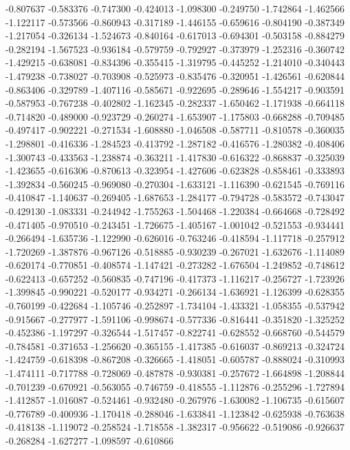 -0.807637
-0.583376
-0.747300
-0.424013
-1.098300
-0.249750
-1.742864
-1.462566
-1.122117
-0.573566
-0.860943
-0.317189
-1.446155
-0.659616
-0.804190
-0.387349
-1.217054
-0.326134
-1.524673
-0.840164
-0.617013
-0.694301
-0.503158
-0.884279
-0.282194
-1.567523
-0.936184
-0.579759
-0.792927
-0.373979
-1.252316
-0.360742
-1.429215
-0.638081
-0.834396
-0.355415
-1.319795
-0.445252
-1.214010
-0.340443
-1.479238
-0.738027
-0.703908
-0.525973
-0.835476
-0.320951
-1.426561
-0.620844
-0.863406
-0.329789
-1.407116
-0.585671
-0.922695
-0.289646
-1.554217
-0.903591
-0.587953
-0.767238
-0.402802
-1.162345
-0.282337
-1.650462
-1.171938
-0.664118
-0.714820
-0.489000
-0.923729
-0.260274
-1.653907
-1.175803
-0.668288
-0.709485
-0.497417
-0.902221
-0.271534
-1.608880
-1.046508
-0.587711
-0.810578
-0.360035
-1.298801
-0.416336
-1.284523
-0.413792
-1.287182
-0.416576
-1.280382
-0.408406
-1.300743
-0.433563
-1.238874
-0.363211
-1.417830
-0.616322
-0.868837
-0.325039
-1.423655
-0.616306
-0.870613
-0.323954
-1.427606
-0.623828
-0.858461
-0.333893
-1.392834
-0.560245
-0.969080
-0.270304
-1.633121
-1.116390
-0.621545
-0.769116
-0.410847
-1.140637
-0.269405
-1.687653
-1.284177
-0.794728
-0.583572
-0.743047
-0.429130
-1.083331
-0.244942
-1.755263
-1.504468
-1.220384
-0.664668
-0.728492
-0.471405
-0.970510
-0.243451
-1.726675
-1.405167
-1.001042
-0.521553
-0.934441
-0.266494
-1.635736
-1.122990
-0.626016
-0.763246
-0.418594
-1.117718
-0.257912
-1.720269
-1.387876
-0.967126
-0.518885
-0.930239
-0.267021
-1.632676
-1.114089
-0.620174
-0.770851
-0.408574
-1.147421
-0.273282
-1.676504
-1.249852
-0.748612
-0.622413
-0.657252
-0.560835
-0.747196
-0.417373
-1.116217
-0.256727
-1.723926
-1.399845
-0.990221
-0.520177
-0.934271
-0.266134
-1.636921
-1.126399
-0.628355
-0.760199
-0.422684
-1.105746
-0.252897
-1.734104
-1.433321
-1.058355
-0.537942
-0.915667
-0.277977
-1.591106
-0.998674
-0.577336
-0.816441
-0.351820
-1.325252
-0.452386
-1.197297
-0.326544
-1.517457
-0.822741
-0.628552
-0.668760
-0.544579
-0.784581
-0.371653
-1.256620
-0.365155
-1.417385
-0.616037
-0.869213
-0.324724
-1.424759
-0.618398
-0.867208
-0.326665
-1.418051
-0.605787
-0.888024
-0.310993
-1.474111
-0.717788
-0.728069
-0.487878
-0.930381
-0.257672
-1.664898
-1.208844
-0.701239
-0.670921
-0.563055
-0.746759
-0.418555
-1.112876
-0.255296
-1.727894
-1.412857
-1.016087
-0.524461
-0.932480
-0.267976
-1.630082
-1.106735
-0.615607
-0.776789
-0.400936
-1.170418
-0.288046
-1.633841
-1.123842
-0.625938
-0.763638
-0.418138
-1.119072
-0.258524
-1.718558
-1.382317
-0.956622
-0.519086
-0.926637
-0.268284
-1.627277
-1.098597
-0.610866
